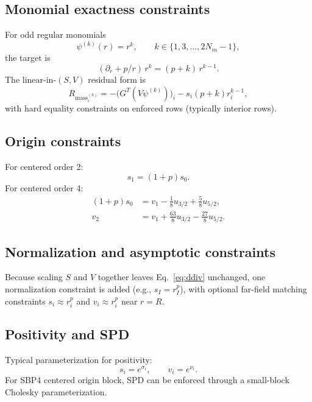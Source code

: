 \documentclass[
  aps,
  pre,
  reprint,
  superscriptaddress,
  nofootinbib
]{revtex4-2}
\newcommand{\Rmass}{R_{\mathrm{mass}}}
\begin{document}
\subsection{Monomial exactness constraints}
For odd regular monomials
\begin{equation}
  \psi^{(k)}(r)=r^k,\qquad k\in\{1,3,\dots,2N_m-1\},
\end{equation}
the target is
\begin{equation}
  (\partial_r+p/r)\,r^k = (p+k)\,r^{k-1}.
\end{equation}
The linear-in-$(S,V)$ residual form is
\begin{equation}
  \Rmass_i^{(k)} =
  -\bigl(G^T(V\psi^{(k)})\bigr)_i
  - s_i (p+k) r_i^{k-1},
\end{equation}
with hard equality constraints on enforced rows (typically interior rows).

\subsection{Origin constraints}
For centered order 2:
\begin{equation}
  s_1=(1+p)s_0.
\end{equation}
For centered order 4:
\begin{align}
  (1+p)s_0 &= v_1-\tfrac18 u_{3/2}+\tfrac58 u_{5/2}, \\
  v_2 &= v_1+\tfrac{63}{8}u_{3/2}-\tfrac{27}{8}u_{5/2}.
\end{align}

\subsection{Normalization and asymptotic constraints}
Because scaling $S$ and $V$ together leaves Eq.~\eqref{eq:ddiv} unchanged, one
normalization constraint is added (e.g., $s_I=r_I^p$), with optional far-field matching
constraints $s_i\approx r_i^p$ and $v_i\approx r_i^p$ near $r=R$.

\subsection{Positivity and SPD}
Typical parameterization for positivity:
\begin{equation}
  s_i=e^{\sigma_i}, \qquad v_i=e^{\nu_i}.
\end{equation}
For SBP4 centered origin block, SPD can be enforced through a small-block Cholesky
parameterization.
\end{document}
